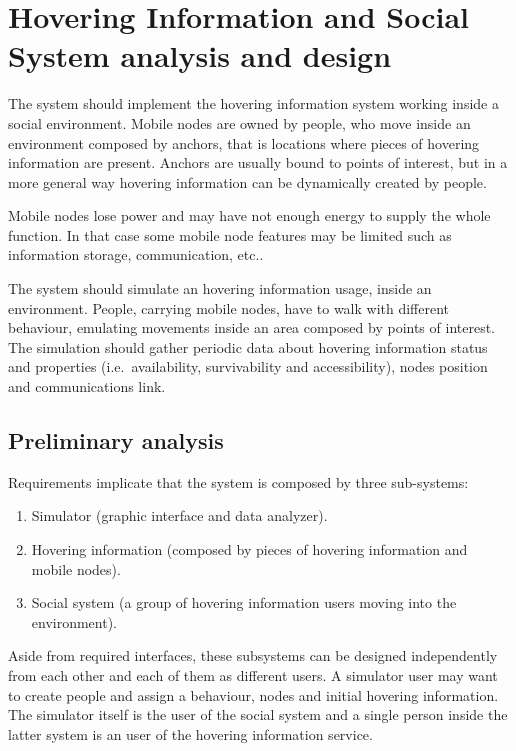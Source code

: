 \section{Hovering Information and Social System analysis and design}
\label{sec:design}

The system should implement the hovering information system working inside
a social environment. Mobile nodes are owned by people, who move inside an
environment composed by anchors, that is locations where pieces of hovering
information are present. Anchors are usually bound to points of interest, but
in a more general way hovering information can be dynamically created by people.

Mobile nodes lose power and may have not enough energy to supply the whole
function.  In that case some mobile node features may be limited such as
information storage, communication, etc..

The system should simulate an hovering information usage, inside an
environment.  People, carrying mobile nodes, have to walk with different
behaviour, emulating movements inside an area composed by points of interest.
The simulation should gather periodic data about hovering information status
and properties (i.e.\ availability, survivability and accessibility), nodes
position and communications link.

\subsection{Preliminary analysis}

Requirements implicate that the system is composed by three sub-systems:
\begin{enumerate}
	\item Simulator (graphic interface and data analyzer).
	\item Hovering information (composed by pieces of hovering information and
		mobile nodes).
	\item Social system (a group of hovering information users moving into
		the environment).
\end{enumerate}

Aside from required interfaces, these subsystems can be designed independently
from each other and each of them as different users. A simulator user may want
to create people and assign a behaviour, nodes and initial hovering information.
The simulator itself is the user of the social system and a single person inside
the latter system is an user of the hovering information service.

